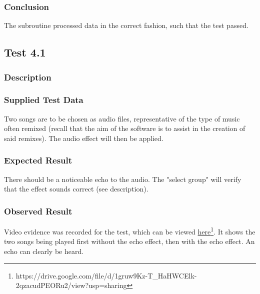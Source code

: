 \subsubsection*{Conclusion}
The subroutine processed data in the correct fashion, such that the test passed.

\pagebreak
\subsection{Test 4.1}
\subsubsection*{Description}
\paragraph{}
{
	\centering
}

\subsubsection*{Supplied Test Data}
Two songs are to be chosen as audio files, representative of the type of music often remixed (recall that the aim of the software is to assist in the creation of said remixes). The audio effect will then be applied.

\subsubsection*{Expected Result}
There should be a noticeable echo to the audio. The "select group" will verify that the effect sounds correct (see description).

\subsubsection*{Observed Result}
\label{sec:evidence4.1}
Video evidence was recorded for the test, which can be viewed \href{https://drive.google.com/file/d/1gruw9Kz-T_HaHWCElk-2qzacudPEORu2/view?usp=sharing}{here}\footnote{
	https://drive.google.com/file/d/1gruw9Kz-T\_HaHWCElk-2qzacudPEORu2/view?usp=sharing
}. It shows the two songs being played first without the echo effect, then with the echo effect. An echo can clearly be heard.

